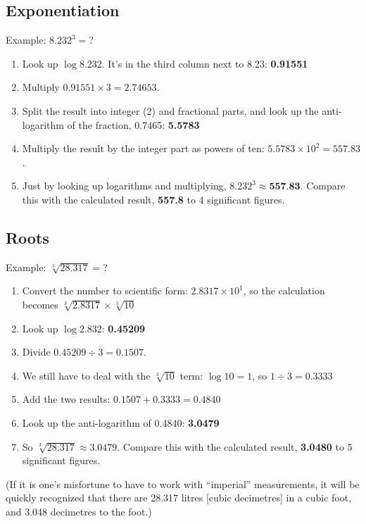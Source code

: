 \documentclass[twoside,a4paper]{article}
\begin{document}
\subsection{Exponentiation}

Example: $8.232^3 = $?
\begin{enumerate}
\item Look up $\log{8.232}$. It's in the third column next to 8.23: \textbf{0.91551}
\item Multiply $0.91551 \times 3 = 2.74653$.
\item Split the result into integer (2) and fractional parts, and look up the anti-logarithm of the fraction, 0.7465: \textbf{5.5783}
\item Multiply the result by the integer part as powers of ten: $5.5783 \times 10^2 = 557.83$.
\item Just by looking up logarithms and multiplying, $8.232^3 \approx \textbf{557.83}$. Compare this with the calculated result, \textbf{557.8} to 4 significant figures.
\end{enumerate}

\subsection{Roots}

Example: $\sqrt[3]{28.317}= $?
\begin{enumerate}
\item Convert the number to scientific form: $2.8317 \times 10^1$, so the calculation becomes 
$\sqrt[3]{2.8317} \times \sqrt[3]{10}$
\item Look up $\log{2.832}$: \textbf{0.45209}
\item Divide $0.45209 \div 3 = 0.1507$.
\item We still have to deal with the $\sqrt[3]{10}$ term: $\log{10} = 1$, so $1 \div 3 = 0.3333$
\item Add the two results: $0.1507 + 0.3333 = 0.4840$
\item Look up the anti-logarithm of 0.4840: \textbf{3.0479}
\item So $\sqrt[3]{28.317} \approx 3.0479$. Compare this with the calculated result, \textbf{3.0480} to 5 significant figures.
\end{enumerate}
(If it is one's misfortune to have to work with ``imperial''
measurements, it will be quickly recognized that there are 28.317
litres [cubic decimetres] in a cubic foot, and 3.048 decimetres to the
foot.) 

\vfill
\end{document}
